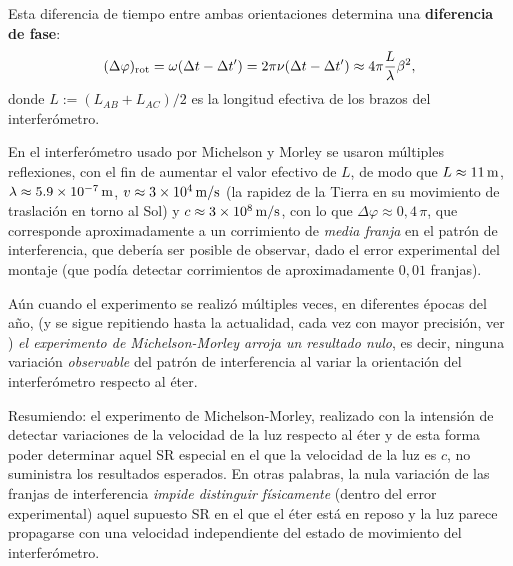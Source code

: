 Esta diferencia de tiempo entre ambas orientaciones determina una \textbf{diferencia de fase}:
\begin{equation}
(\Delta\varphi)_{\rm rot}=\omega(\Delta t-\Delta t')=2\pi\nu(\Delta t-\Delta t')\approx 4\pi\frac{L}{\lambda} \beta^2,
\end{equation}
donde $L:=(L_{AB}+L_{AC})/2$ es la longitud efectiva de los brazos del interferómetro.

En el interferómetro usado por Michelson y Morley se usaron múltiples reflexiones, con el fin de aumentar el valor efectivo de $L$, de modo que $L\approx 11\,\rm m$, $\lambda\approx 5.9\times 10^{-7}\,\rm m$, $v\approx 3\times 10^4\,\rm m/s$ (la rapidez de la Tierra en su movimiento de traslación en torno al Sol) y $c \approx 3\times 10^{8}\,\rm m/s$, con lo que $\Delta\varphi \approx 0,4\,\pi$, que corresponde aproximadamente a un corrimiento de \textit{media franja} en el patrón de interferencia, que debería ser posible de observar, dado el error experimental del montaje (que podía detectar corrimientos de aproximadamente $0,01$ franjas).

Aún cuando el experimento se realizó múltiples veces, en diferentes épocas del a\~no, (y se sigue repitiendo hasta la actualidad, cada vez con mayor precisión, ver \cite{MHBSP03}) \textit{el experimento de Michelson-Morley arroja un resultado nulo}, es decir, ninguna variación \textit{observable} del patrón de interferencia al variar la orientación del interferómetro respecto al éter.

Resumiendo: el experimento de Michelson-Morley, realizado con la intensión de detectar variaciones de la velocidad de la luz respecto al éter y de esta forma poder determinar aquel SR especial en el que la velocidad de la luz es $c$, no suministra los resultados esperados. En otras palabras, la nula variación de las franjas de interferencia \textit{impide distinguir físicamente }(dentro del error experimental) aquel supuesto SR en el que el éter está en reposo y la luz parece propagarse con una velocidad independiente del estado de movimiento del interferómetro.

